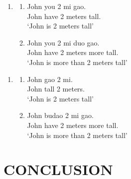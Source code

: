 \documentclass{ctexart}
\begin{document}
\begin{enumerate}
    \item \label{assignable_example_1}
    \begin{enumerate}
        \item \label{assignable_example_1_a}
        John you 2 mi gao. \\
        John have 2 meters tall. \\
        `John is 2 meters tall'
        
        \item \label{assignable_example_1_b}
        John you 2 mi duo gao. \\
        John have 2 meters more tall. \\
        `John is more than 2 meters tall'
        
    \end{enumerate}
\end{enumerate}

\begin{enumerate}
    \item \label{assignable_example_transitive}
    \begin{enumerate}
        \item \label{assignable_example_transitive_a}
        John gao 2 mi. \\
        John tall 2 meters.\\
        `John is 2 meters tall'
        
        \item \label{assignable_example_transitive_b}
        John budao 2 mi gao. \\
        John have 2 meters more tall. \\
        `John is more than 2 meters tall'
        
    \end{enumerate}
\end{enumerate}

\section{CONCLUSION}

\newpage

\printbibliography
\end{document}
